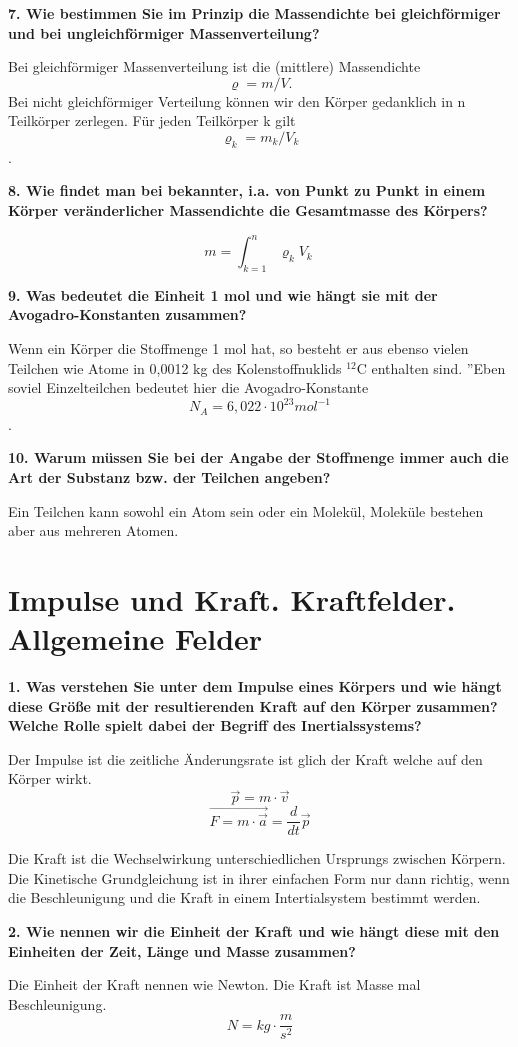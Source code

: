 \documentclass[12pt,a4paper,twoside]{book}
\newcommand{\nqu}[1]{\vspace*{10mm} \noindent \textbf{#1} \par \vspace*{1mm}}
\begin{document}
\nqu{7. Wie bestimmen Sie im Prinzip die Massendichte bei gleichförmiger und bei ungleichförmiger Massenverteilung?}
Bei gleichförmiger Massenverteilung ist die (mittlere) Massendichte \[\varrho=m/V.\]
Bei nicht gleichförmiger Verteilung können wir den Körper gedanklich in n Teilkörper zerlegen. Für jeden Teilkörper k gilt \[\varrho_{k}=m_{k}/V_{k}\].

\nqu{8. Wie findet man bei bekannter, i.a. von Punkt zu Punkt in einem Körper veränderlicher Massendichte die Gesamtmasse des Körpers?}
\[m=\int_{k=1}^{n} \varrho_{k} V_{k}\ \]

\nqu{9. Was bedeutet die Einheit 1 mol und wie hängt sie mit der Avogadro-Konstanten zusammen?}
Wenn ein Körper die Stoffmenge 1 mol hat, so besteht er aus ebenso vielen Teilchen wie Atome in 0,0012 kg des Kolenstoffnuklids $^{12}$C enthalten sind. ''Eben soviel Einzelteilchen bedeutet hier die Avogadro-Konstante \[N_{A}=6,022\cdot10^{23} mol^{-1}\].

\nqu{10. Warum müssen Sie bei der Angabe der Stoffmenge immer auch die Art der Substanz bzw. der Teilchen angeben?}
Ein Teilchen kann sowohl ein Atom sein oder ein Molekül, Moleküle bestehen aber aus mehreren Atomen.


\chapter{Impulse und Kraft. Kraftfelder. Allgemeine Felder}

\nqu{1. Was verstehen Sie unter dem Impulse eines Körpers und wie hängt diese Größe mit der resultierenden Kraft auf den Körper zusammen? Welche Rolle spielt dabei der Begriff des Inertialssystems?}
Der Impulse ist die zeitliche Änderungsrate ist glich der Kraft welche auf den Körper wirkt.
\[\vec{p}=m\cdot\vec{v}\]
\[\vec{F= m\cdot \vec{a}}=\frac{d}{dt}\vec{p}\]

Die Kraft ist die Wechselwirkung unterschiedlichen Ursprungs zwischen Körpern.
Die Kinetische Grundgleichung ist in ihrer einfachen Form nur dann richtig, wenn die Beschleunigung und die Kraft in einem Intertialsystem bestimmt werden.

\nqu{2. Wie nennen wir die Einheit der Kraft und wie hängt diese mit den Einheiten der Zeit, Länge und Masse zusammen?}
Die Einheit der Kraft nennen wie Newton. Die Kraft ist Masse mal Beschleunigung.
\[N=kg\cdot \frac{m}{s^2}\]
\end{document}
